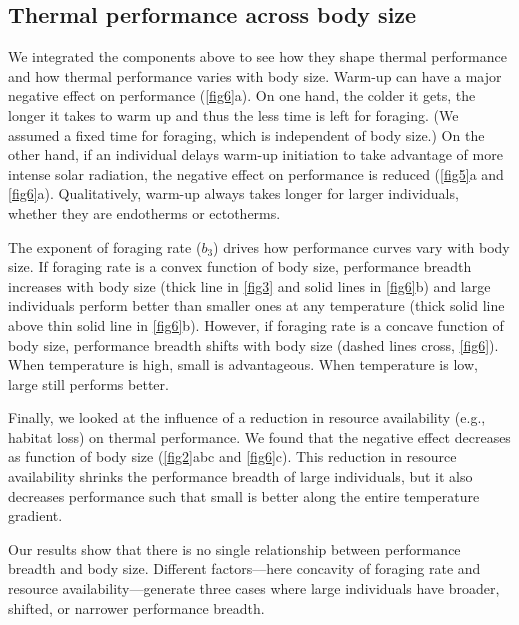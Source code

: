 \subsection*{Thermal performance across body size}
 We integrated the components above to see how they shape thermal performance and how thermal performance varies with body size.
Warm-up can have a major negative effect on performance (\cref{fig6}a).
On one hand, the colder it gets, the longer it takes to warm up and thus the less time is left for foraging.
(We assumed a fixed time for foraging, which is independent of body size.)
On the other hand, if an individual delays warm-up initiation to take advantage of more intense solar radiation, the negative effect on performance is reduced (\cref{fig5}a and \cref{fig6}a). %
Qualitatively, warm-up always takes longer for larger individuals, whether they are endotherms or ectotherms.

The exponent of foraging rate ($b_3$) drives how performance curves vary with body size.
If foraging rate is a convex function of body size, performance breadth increases with body size (thick line in \cref{fig3} and solid lines in \cref{fig6}b) and large individuals perform better than smaller ones at any temperature (thick solid line above thin solid line in \cref{fig6}b).
However, if foraging rate is a concave function of body size, performance breadth shifts with body size (dashed lines cross, \cref{fig6}).
When temperature is high, small is advantageous.
When temperature is low, large still performs better.
   
Finally, we looked at the influence of a reduction in resource availability (e.g., habitat loss) on thermal performance.
We found that the negative effect decreases as function of body size (\cref{fig2}abc and \cref{fig6}c). 
This reduction in resource availability shrinks the performance breadth of large individuals, but it also decreases performance such that small is better along the entire temperature gradient.

Our results show that there is no single relationship between performance breadth and body size. 
Different factors---here concavity of foraging  rate and resource availability---generate three cases where large individuals have broader, shifted, or narrower performance breadth.
